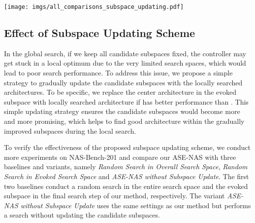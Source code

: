 \documentclass[lettersize,journal]{IEEEtran}
\newcommand{\sexyname}{ASE-NAS\xspace}
\begin{document}
\begin{figure*}[!t]
\centering
{}
\hfil
{}
\caption{The performance difference that is measured by accuracy (\%) \vs~the architecture distance in NAS-Bench-201 search space (a) and MobileNet-like search space (b).}
\label{fig:acc_vs_dist}
\end{figure*}

\begin{figure*}[t]
\centering
\texttt{[image: imgs/all\_comparisons\_subspace\_updating.pdf]}
\caption{
Comparisons of the search performance with/without subspace updating on NAS-Bench-201.
}
\label{fig:all_comparisons_subspace_updating}
\end{figure*}


\subsection{Effect of Subspace Updating Scheme}
\label{sec:ablation_subspace_updating}

In the global search, if we keep all candidate subspaces fixed, the controller may get stuck in a local optimum due to the very limited search spaces, which would lead to poor search performance.
To address this issue, we propose a simple strategy to gradually update the candidate subspaces with the locally searched architectures.
To be specific, we replace the center architecture  in the evoked subspace with locally searched architecture  if  has better performance than .
This simple updating strategy ensures the candidate subspaces would become more and more promising, which helps to find good architecture within the gradually improved subspaces during the local search.

To verify the effectiveness of the proposed subspace updating scheme, we conduct more experiments on NAS-Bench-201 and compare our \sexyname with three baselines and variants, namely \textit{Random Search in Overall Search Space}, \textit{Random Search in Evoked Search Space} and \textit{\sexyname without Subspace Update}.
The first two baselines conduct a random search in the entire search space and the evoked subspace in the final search step of our method, respectively.
The variant \textit{\sexyname without Subspace Update} uses the same settings as our method but performs a search without updating the candidate subspaces.
\end{document}
